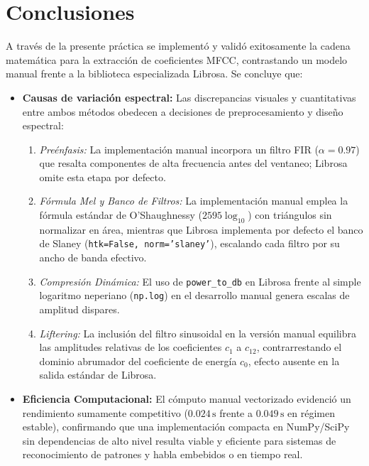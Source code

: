 \documentclass[12pt]{article}
\begin{document}
\newpage

\section{Conclusiones}
A través de la presente práctica se implementó y validó exitosamente la cadena matemática para la extracción de coeficientes MFCC, contrastando un modelo manual frente a la biblioteca especializada Librosa. Se concluye que:
\begin{itemize}
	\item \textbf{Causas de variación espectral:} Las discrepancias visuales y cuantitativas entre ambos métodos obedecen a decisiones de preprocesamiento y diseño espectral:
	\begin{enumerate}
		\item \textit{Preénfasis:} La implementación manual incorpora un filtro FIR ($\alpha = 0.97$) que resalta componentes de alta frecuencia antes del ventaneo; Librosa omite esta etapa por defecto.
		\item \textit{Fórmula Mel y Banco de Filtros:} La implementación manual emplea la fórmula estándar de O'Shaughnessy ($2595\log_{10}$) con triángulos sin normalizar en área, mientras que Librosa implementa por defecto el banco de Slaney (\texttt{htk=False, norm='slaney'}), escalando cada filtro por su ancho de banda efectivo.
		\item \textit{Compresión Dinámica:} El uso de \texttt{power\_to\_db} en Librosa frente al simple logaritmo neperiano (\texttt{np.log}) en el desarrollo manual genera escalas de amplitud dispares.
		\item \textit{Liftering:} La inclusión del filtro sinusoidal en la versión manual equilibra las amplitudes relativas de los coeficientes $c_1$ a $c_{12}$, contrarrestando el dominio abrumador del coeficiente de energía $c_0$, efecto ausente en la salida estándar de Librosa.
	\end{enumerate}
	\item \textbf{Eficiencia Computacional:} El cómputo manual vectorizado evidenció un rendimiento sumamente competitivo ($0.024\,\text{s}$ frente a $0.049\,\text{s}$ en régimen estable), confirmando que una implementación compacta en NumPy/SciPy sin dependencias de alto nivel resulta viable y eficiente para sistemas de reconocimiento de patrones y habla embebidos o en tiempo real.
\end{itemize}

\newpage
\end{document}
